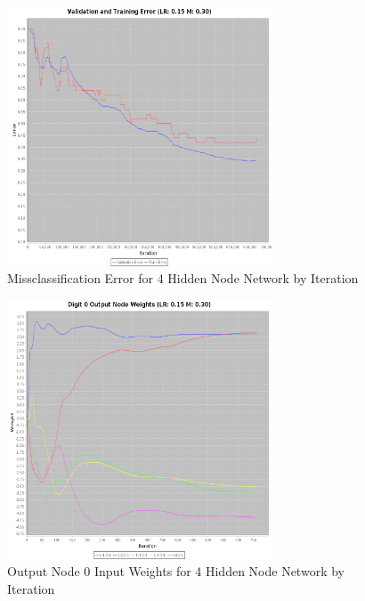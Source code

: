 \documentclass{article}
\begin{document}
\begin{figure}
\centering
\includegraphics[width=0.7\textwidth]{data/final/4_hidden_node_error.png}
\caption{Missclassification Error for 4 Hidden Node Network by Iteration}
\label{error4}
\end{figure}

\begin{figure}
\centering
\includegraphics[width=0.7\textwidth]{data/final/4_hidden_node_0weight.png}
\caption{Output Node 0 Input Weights for 4 Hidden Node Network by Iteration}
\label{weight4}
\end{figure}
\end{document}
